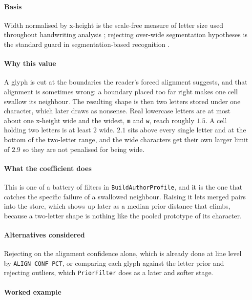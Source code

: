 \paragraph{Basis}

Width normalised by x-height is the scale-free measure of letter size used throughout handwriting analysis \cite{vinciarelli2001}; rejecting over-wide segmentation hypotheses is the standard guard in segmentation-based recognition \cite{likforman2007}.

\paragraph{Why this value}

A glyph is cut at the boundaries the reader's forced alignment suggests, and that alignment is sometimes wrong: a boundary placed too far right makes one cell swallow its neighbour. The resulting shape is then two letters stored under one character, which later draws as nonsense. Real lowercase letters are at most about one x-height wide and the widest, \texttt{m} and \texttt{w}, reach roughly $1.5$. A cell holding two letters is at least $2$ wide. $2.1$ sits above every single letter and at the bottom of the two-letter range, and the wide characters get their own larger limit of $2.9$ so they are not penalised for being wide.

\paragraph{What the coefficient does}

This is one of a battery of filters in \texttt{BuildAuthorProfile}, and it is the one that catches the specific failure of a swallowed neighbour. Raising it lets merged pairs into the store, which shows up later as a median prior distance that climbs, because a two-letter shape is nothing like the pooled prototype of its character.

\paragraph{Alternatives considered}

Rejecting on the alignment confidence alone, which is already done at line level by \texttt{ALIGN\_CONF\_PCT}, or comparing each glyph against the letter prior and rejecting outliers, which \texttt{PriorFilter} does as a later and softer stage.

\paragraph{Worked example}

